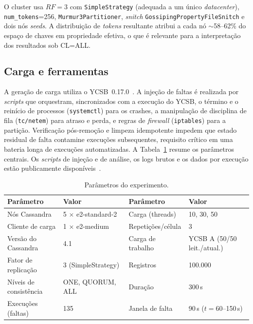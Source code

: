 \documentclass[runningheads]{llncs}
\begin{document}
O cluster usa $RF=3$ com \texttt{SimpleStrategy} (adequada a um único
\emph{datacenter}), \texttt{num\_tokens}=256, \texttt{Murmur3\-Partitioner},
\emph{snitch} \texttt{Gossiping\-Property\-File\-Snitch} e dois nós \emph{seeds}. A
distribuição de \emph{tokens} resultante atribui a cada nó $\sim$58--62\% do
espaço de chaves em propriedade efetiva, o que é relevante para a interpretação
dos resultados sob CL=ALL.

\subsection{Carga e ferramentas}

A geração de carga utiliza o YCSB~0.17.0~\cite{ycsb}. A injeção de faltas é
realizada por \emph{scripts} que orquestram, sincronizados com a execução do
YCSB, o término e o reinício de processos (\texttt{systemctl}) para os crashes, a
manipulação de disciplina de fila (\texttt{tc/netem}) para atraso e perda, e
regras de \emph{firewall} (\texttt{iptables}) para a partição. Verificação
pós-remoção e limpeza idempotente impedem que estado residual de falta contamine
execuções subsequentes, requisito crítico em uma bateria longa de execuções
automatizadas. A Tabela~\ref{tab:params} resume os parâmetros centrais. Os
\emph{scripts} de injeção e de análise, os logs brutos e os dados por execução
estão publicamente disponíveis~\cite{artifact}.

\begin{table}[t]
\centering
\scriptsize
\renewcommand{\arraystretch}{1.15}
\setlength{\tabcolsep}{3.5pt}
\caption{Parâmetros do experimento.}
\label{tab:params}
\begin{tabular}{llll}
\toprule
\textbf{Parâmetro} & \textbf{Valor} & \textbf{Parâmetro} & \textbf{Valor} \\
\midrule
\rowcolor{gray!12}
Nós Cassandra & 5 $\times$ e2-standard-2 & Carga (threads) & 10, 30, 50 \\
Cliente de carga & 1 $\times$ e2-medium & Repetições/célula & 3 \\
\rowcolor{gray!12}
Versão do Cassandra & 4.1 & Carga de trabalho & YCSB A (50/50 leit./atual.) \\
Fator de replicação & 3 (SimpleStrategy) & Registros & 100.000 \\
\rowcolor{gray!12}
Níveis de consistência & ONE, QUORUM, ALL & Duração & 300\,s \\
Execuções (faltas) & 135 & Janela de falta & 90\,s ($t=60$--150\,s) \\
\bottomrule
\end{tabular}
\end{table}
\end{document}
